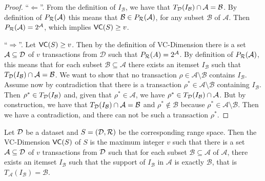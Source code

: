 \begin{proof} ``$\Leftarrow$''.
  From the definition of $I_\mathcal{B}$, we have that
  $T_{\cal D}(I_\mathcal{B})\cap\mathcal{A}=\mathcal{B}$. By definition of
  $P_{\mathcal{R}}(\mathcal{A})$ this means that $\mathcal{B}\in P_{\mathcal{R}}(\mathcal{A})$, for any
  subset $\mathcal{B}$ of $\mathcal{A}$. Then $P_{\mathcal{R}}(\mathcal{A})=2^\mathcal{A}$,
  which implies $\mathsf{VC}(S)\ge v$.

  ``$\Rightarrow$''. Let $\mathsf{VC}(S)\ge v$. Then by the definition of VC-Dimension there
  is a set $\mathcal{A}\subseteq{\cal D}$ of $v$ transactions from $\mathcal{D}$ such
  that $P_{\mathcal{R}}(A)=2^{\mathcal{A}}$. By definition of $P_{\mathcal{R}}(\mathcal{A})$, this means
  that for each subset $\mathcal{B}\subseteq\mathcal{A}$ there exists an itemset
  $I_\mathcal{B}$ such that $T_{\cal D}(I_\mathcal{B})\cap\mathcal{A}=\mathcal{B}$.
  We want to show that no transaction $\rho\in\mathcal{A}\setminus\mathcal{B}$
  contains $I_\mathcal{B}$. Assume now by contradiction that there is a
  transaction $\rho^*\in\mathcal{A}\setminus\mathcal{B}$ containing
  $I_\mathcal{B}$. Then $\rho^*\in T_{\cal D}(I_\mathcal{B})$ and, given that
  $\rho^*\in\mathcal{A}$, we have $\rho^*\in
  T_{\cal D}(I_\mathcal{B})\cap\mathcal{A}$. But by construction, we have that
  $T_{\cal D}(I_\mathcal{B})\cap\mathcal{A}=\mathcal{B}$ and
  $\rho^*\notin\mathcal{B}$ because $\rho^*\in\mathcal{A}\setminus\mathcal{B}$.
  Then we have a contradiction, and there can not be such a transaction
  $\rho^*$.
\end{proof}

\begin{corollary} Let ${\cal D}$ be a dataset and $S=({\cal D},\mathcal{R})$ be the corresponding
  range space. Then the VC-Dimension $\mathsf{VC}(S)$ of $S$ is the maximum integer
  $v$ such that there is a set $\mathcal{A}\subseteq{\cal D}$ of $v$ transactions
  from ${\cal D}$ such that for each subset $\mathcal{B}\subseteq\mathcal{A}$ of
  $\mathcal{A}$, there exists an itemset $I_\mathcal{B}$ such that the support
  of $I_\mathcal{B}$ in $\mathcal{A}$ is exactly $\mathcal{B}$, that is
  $T_\mathcal{A}(I_\mathcal{B})=\mathcal{B}$.
\end{corollary}

